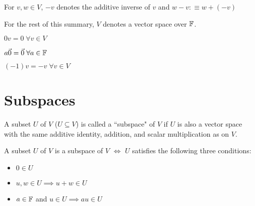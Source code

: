 \begin{mydef}
    For $v,w\in V$, $-v$ denotes the additive inverse of $v$ and $w-v:\equiv w+(-v)$
\end{mydef}

\begin{mydef}
    For the rest of this summary, $V$ denotes a vector space over ${\mathbb{F}}$.
\end{mydef}

\begin{thm}
    $0v = 0 \; \forall v\in V$
\end{thm}

\begin{thm}
    $a \vec0= \vec0 \; \forall a\in {\mathbb{F}}$
\end{thm}

\begin{thm}
    $(-1)v = -v \; \forall v\in V$
\end{thm}

\section{Subspaces}

\begin{mydef}
    A subset $U$ of $V$ ($U \subseteq V$) is called a ``subspace" of $V$ if $U$ is also a vector space with the same additive identity, addition, and scalar multiplication as on $V$.
\end{mydef}

\begin{thm}
    A subset $U$ of $V$ is a subspace of $V$ $\iff$ $U$ satisfies the following three conditions:
    \begin{itemize}
        \item {} 
        $0 \in U$
        \item {} 
        $u,w \in U \implies u+w \in U$
        \item {} 
        $a \in {\mathbb{F}}$ and $u \in U \implies au \in U$
    \end{itemize}
\end{thm}



